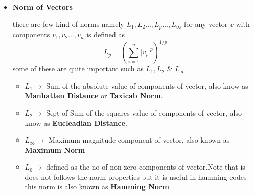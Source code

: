 \documentclass[a4paper]{article}
\numberwithin{equation}{section}
\begin{document}
\begin{itemize}
\item \textbf{Norm of Vectors}

there are few kind of norms namely $L_1,L_2\dots,L_p\dots,L_{\infty}$ for any vector $v$ with components $v_1,v_2\dots,v_n $ is defined as
\begin{equation}
    L_p=\left(\sum_{i=1}^{n}\vert v_i\vert^p\right)^{1/p} \tag{$L_p$ Norm} 
\end{equation}
some of these are quite important such as $L_1,L_2$ \& $L_{\infty}$
\begin{itemize}
    \item $L_1 \rightarrow$ Sum of the absolute value of components of vector, also know as \textbf{Manhatten Distance} or \textbf{Taxicab Norm}.
    \item $L_2 \rightarrow$ Sqrt of Sum of the squares value of components of vector, also know as \textbf{Eucleadian Distance}.
    \item $L_{\infty} \rightarrow$ Maximum magnitude component of vector, also known as \textbf{Maximum Norm}
    \item $L_0\rightarrow$ defined as the no of non zero components of vector.Note that is does not follows the norm properties but it is useful  in hamming codes this norm is also known as \textbf{Hamming Norm}
    
\end{itemize}



\end{itemize}
\end{document}
